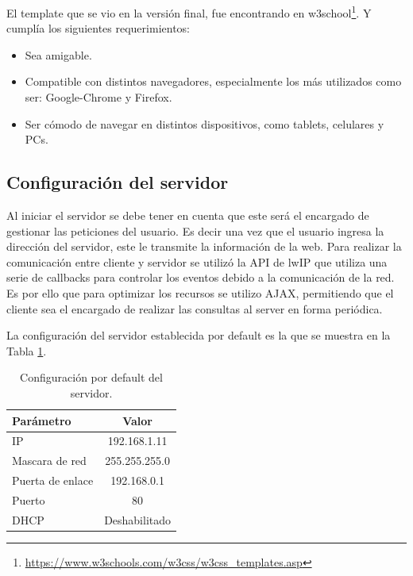 El template que se vio en la versión final, fue encontrando en w3school\footnote{\url{https://www.w3schools.com/w3css/w3css_templates.asp}}.
Y cumplía los siguientes requerimientos:
\begin{itemize}
  \item Sea amigable.
  \item Compatible con distintos navegadores, especialmente los más utilizados como ser: Google-Chrome y Firefox. 
  \item Ser cómodo de navegar en distintos dispositivos, como tablets, celulares y PCs.
\end{itemize}


\subsection{Configuración del servidor}
Al iniciar el servidor se debe tener en cuenta que este será el encargado de gestionar las peticiones del usuario. 
Es decir una vez que el usuario ingresa la dirección del servidor, este le transmite la información de la web.
Para realizar la comunicación entre cliente y servidor se utilizó la API de lwIP \citep{webserver}  que utiliza una serie de callbacks para controlar los eventos debido a la comunicación de la red. Es por ello que para optimizar los recursos se utilizo AJAX, permitiendo que el cliente sea el encargado de realizar las consultas al server en forma periódica.

La configuración del servidor establecida por default es la que se muestra en la Tabla \ref{tab:servercfg}.
\begin{table}[!h]
  \centering
  \begin{tabular}{l c}
    \hline 
    Parámetro    & Valor \\
    \hline \hline
    IP               & 192.168.1.11 \\
    Mascara de red   & 255.255.255.0 \\
    Puerta de enlace & 192.168.0.1 \\
    Puerto           & 80 \\
    DHCP             & Deshabilitado \\
    \hline
  \end{tabular}
  \caption{Configuración por default del servidor.}
  \label{tab:servercfg}
\end{table}


